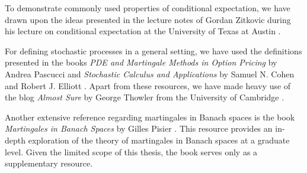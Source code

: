 To demonstrate commonly used properties of conditional expectation, we have drawn upon the ideas presented in the lecture notes of Gordan Zitkovic during his lecture on conditional expectation at the University of Texas at Austin \cite{Zitkovic_2015}.

For defining stochastic processes in a general setting, we have used the definitions presented in the books \textit{PDE and Martingale Methods in Option Pricing} by Andrea Pascucci \cite{Pascucci_2011} and \textit{Stochastic Calculus and Applications} by Samuel N. Cohen and Robert J. Elliott \cite{Elliott_Cohen_1982}. Apart from these resources, we have made heavy use of the blog \textit{Almost Sure} by George Thowler from the University of Cambridge \cite{Thowler}.

Another extensive reference regarding martingales in Banach spaces is the book \textit{Martingales in Banach Spaces} by Gilles Pisier \cite{pisier_2016}. This resource provides an in-depth exploration of the theory of martingales in Banach spaces at a graduate level. Given the limited scope of this thesis, the book serves only as a supplementary resource.
